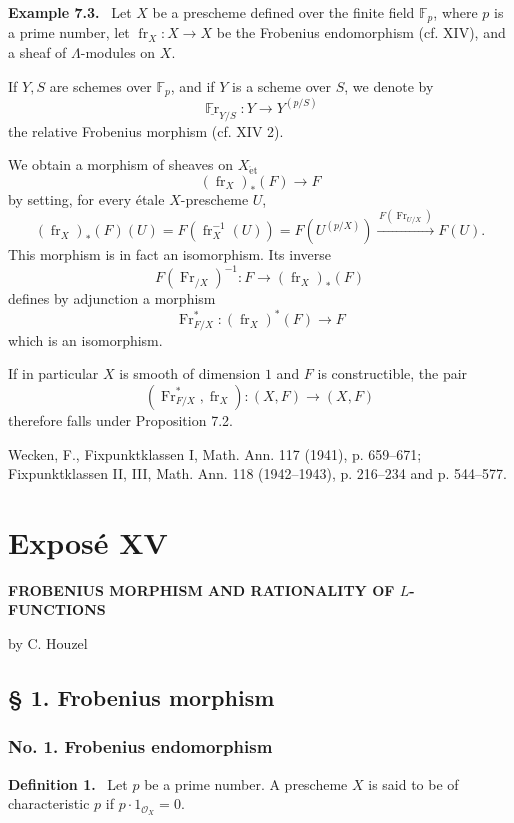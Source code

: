 \documentclass[11pt]{article}
\newenvironment{statement}[1]{\par\medskip\noindent\textbf{#1.}\ }{\par\medskip}
\providecommand{\et}{\mathrm{\acute{e}t}}
\providecommand{\OO}{\mathcal{O}}
\providecommand{\fr}{\operatorname{fr}}
\providecommand{\Fr}{\operatorname{Fr}}
\providecommand{\Fr}{\operatorname{Fr}}
\providecommand{\fr}{\operatorname{fr}}
\providecommand{\et}{\acute{e}t}
\begin{document}
\begin{statement}{Example 7.3}
Let $X$ be a prescheme defined over the finite field $\mathbb F_p$, where $p$ is a prime number, let $\fr_X:X\to X$ be the Frobenius endomorphism (cf. XIV), and a sheaf of $\Lambda$-modules on $X$.

If $Y,S$ are schemes over $\mathbb F_p$, and if $Y$ is a scheme over $S$, we denote by
\[
\underline{\operatorname{\mathbb{F}r}}_{Y/S}:Y\longrightarrow Y^{(p/S)}
\]
the relative Frobenius morphism (cf. XIV 2).

We obtain a morphism of sheaves on $X_{\et}$
\[
(\fr_X)_*(F)\longrightarrow F
\]
by setting, for every étale $X$-prescheme $U$,
\[
(\fr_X)_*(F)(U)=F(\fr_X^{-1}(U))=F(U^{(p/X)})
 \xrightarrow{\,F(\Fr_{U/X})\,}F(U).
\]
This morphism is in fact an isomorphism. Its inverse
\[
F(\Fr_{/X})^{-1}:F\longrightarrow (\fr_X)_*(F)
\]
defines by adjunction a morphism
\[
\Fr_{F/X}^*:(\fr_X)^*(F)\longrightarrow F
\]
which is an isomorphism.

If in particular $X$ is smooth of dimension $1$ and $F$ is constructible, the pair
\[
(\Fr_{F/X}^*,\fr_X):(X,F)\longrightarrow (X,F)
\]
therefore falls under Proposition 7.2.
\end{statement}

\noindent[1] Wecken, F., Fixpunktklassen I, Math. Ann. 117 (1941), p. 659--671; Fixpunktklassen II, III, Math. Ann. 118 (1942--1943), p. 216--234 and p. 544--577.

\section*{Exposé XV}
\begin{center}
\Large\bfseries FROBENIUS MORPHISM AND RATIONALITY OF $L$-FUNCTIONS

\medskip
by C. Houzel
\end{center}

\subsection*{§ 1. Frobenius morphism}

\subsubsection*{No. 1. Frobenius endomorphism}

\begin{statement}{Definition 1}
Let $p$ be a prime number. A prescheme $X$ is said to be of characteristic $p$ if $p\cdot 1_{\OO_X}=0$.
\end{statement}
\end{document}
